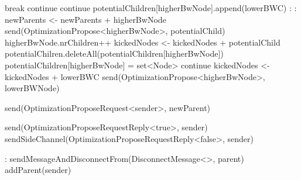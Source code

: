 \begin{algorithm}
\begin{algorithmic}[1]
                \State break
            \EndIf
                \State continue
            \EndIf
                \State continue
            \EndIf
                \State potentialChildren[higherBwNode].append(lowerBWC)
                :
                    :
                        \State newParents <- newParents + higherBwNode
                        \State send(OptimizationPropose<higherBwNode>, potentialChild)
                        \State higherBwNode.nrChildren++
                        \State kickedNodes <- kickedNodes + potentialChild
                    \EndFor
                        \State potentialChilren.deleteAll(potentialChildren[higherBwNode])
                    \EndFor
                    \State potentialChildren[higherBwNode] = set<Node>
                    \State continue
                \EndIf
            \EndIf
            \State kickedNodes <- kickedNodes + lowerBWC
            \State send(OptimizationPropose<higherBwNode>, lowerBWNode)
        \EndFor
    \asdend

            \State send(OptimizationProposeRequest<sender>, newParent)
        \EndIf
    \asdend

         
            \State send(OptimizationProposeRequestReply<true>, sender)
        \Else 
            \State sendSideChannel(OptimizationProposeRequestReply<false>, sender)
        \EndIf
    \asdend

        : 
            \State sendMessageAndDisconnectFrom(DisconnectMessage<>, parent)
            \State addParent(sender)
        \EndIf
    \asdend
    
\end{algorithmic}
\end{algorithm}